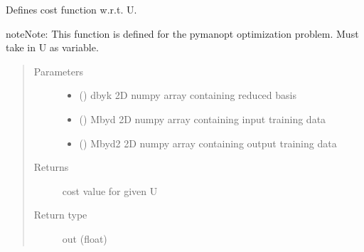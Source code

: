 \documentclass[letterpaper,10pt,english]{sphinxmanual}
\begin{document}
\begin{fulllineitems}
\begin{fulllineitems}
\label{\detokenize{rom:rom.response_surfaces.NN_alt.sub_res}}
\sphinxAtStartPar
Defines cost function w.r.t. U.

\begin{sphinxadmonition}{note}{Note:}
\sphinxAtStartPar
This function is defined for the pymanopt optimization problem. Must take in U as variable.
\end{sphinxadmonition}
\begin{quote}\begin{description}
\item[{Parameters}] \leavevmode\begin{itemize}
\item {} 
\sphinxAtStartPar
{} () \textendash{} d\sphinxhyphen{}by\sphinxhyphen{}k 2D numpy array containing reduced basis

\item {} 
\sphinxAtStartPar
{} () \textendash{} M\sphinxhyphen{}by\sphinxhyphen{}d 2D numpy array containing input training data

\item {} 
\sphinxAtStartPar
{} () \textendash{} M\sphinxhyphen{}by\sphinxhyphen{}d2 2D numpy array containing output training data

\end{itemize}

\item[{Returns}] \leavevmode
\sphinxAtStartPar
cost value for given U

\item[{Return type}] \leavevmode
\sphinxAtStartPar
out (float)

\end{description}\end{quote}

\end{fulllineitems}



\end{fulllineitems}
\end{document}
